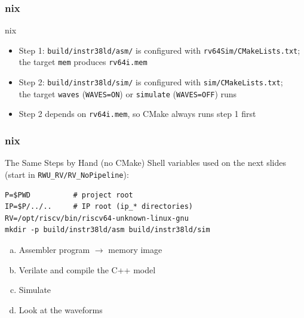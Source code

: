 \documentclass{beamer}
\newcommand{\astitle}{nix}
\newcommand{\assubtitle}{nix}
\newcommand{\cmd}[1]{\texttt{#1}}
\begin{document}
\begin{frame}
\frametitle{\astitle}
\begin{block}{\assubtitle}
  \begin{itemize}
    \item Step 1: \cmd{build/instr38ld/asm/} is configured with
      \cmd{rv64Sim/CMakeLists.txt};\\
      the target \cmd{mem} produces \cmd{rv64i.mem}
    \item Step 2: \cmd{build/instr38ld/sim/} is configured with
      \cmd{sim/CMakeLists.txt};\\
      the target \cmd{waves} (\cmd{WAVES=ON}) or \cmd{simulate} (\cmd{WAVES=OFF}) runs
    \item Step 2 depends on \cmd{rv64i.mem}, so CMake always runs step 1 first
  \end{itemize}
\end{block}
\end{frame}

\renewcommand{\assubtitle}{The Same Steps by Hand (no CMake)}
\begin{frame}[fragile]
\frametitle{\astitle}
\begin{block}{\assubtitle}
  Shell variables used on the next slides (start in \cmd{RWU\_RV/RV\_NoPipeline}):
\begin{lstlisting}[style=sh,basicstyle=\ttfamily\small]
P=$PWD          # project root
IP=$P/../..     # IP root (ip_* directories)
RV=/opt/riscv/bin/riscv64-unknown-linux-gnu
mkdir -p build/instr38ld/asm build/instr38ld/sim
\end{lstlisting}
  \begin{enumerate}[a)]
    \item Assembler program $\rightarrow$ memory image
    \item Verilate and compile the C++ model
    \item Simulate
    \item Look at the waveforms
  \end{enumerate}
\end{block}
\end{frame}
\end{document}
